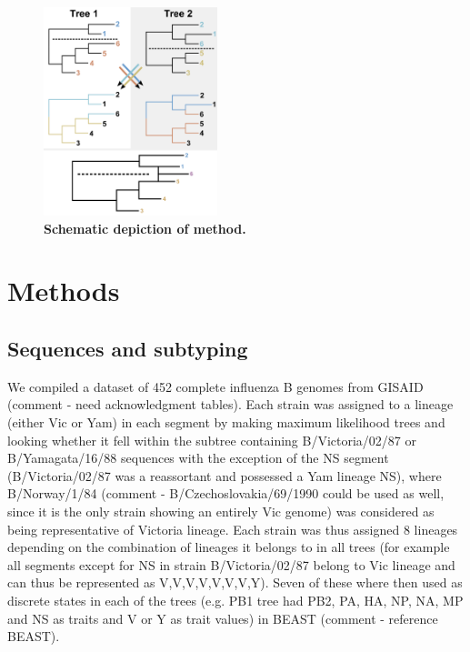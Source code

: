 \documentclass[11pt,oneside,letterpaper]{article}
\begin{document}
\begin{figure}[h]
 \centering		
	\includegraphics[width=0.45\textwidth]{figures/TreeFigure2}
	\caption{\textbf{Schematic depiction of method.}}
	\label{methodFig}
\end{figure}

\section*{Methods}

\subsection*{Sequences and subtyping}
We compiled a dataset of 452 complete influenza B genomes from GISAID (comment - need acknowledgment tables). 
Each strain was assigned to a lineage (either Vic or Yam) in each segment by making maximum likelihood trees and looking whether it fell within the subtree containing B/Victoria/02/87 or B/Yamagata/16/88 sequences with the exception of the NS segment (B/Victoria/02/87 was a reassortant and possessed a Yam lineage NS), where B/Norway/1/84 (comment - B/Czechoslovakia/69/1990 could be used as well, since it is the only strain showing an entirely Vic genome) was considered as being representative of Victoria lineage.
Each strain was thus assigned 8 lineages depending on the combination of lineages it belongs to in all trees (for example all segments except for NS in strain B/Victoria/02/87 belong to Vic lineage and can thus be represented as V,V,V,V,V,V,V,Y). 
Seven of these where then used as discrete states in each of the trees (e.g. PB1 tree had PB2, PA, HA, NP, NA, MP and NS as traits and V or Y as trait values) in BEAST (comment - reference BEAST).
\end{document}
